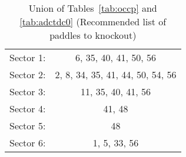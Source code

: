 \begin{table}
\begin{minipage}{\textwidth}
\begin{center}
\begin{singlespacing}

\caption{\label{tab:tofko}Union of Tables~\ref{tab:occp} and \ref{tab:adctdc0} (Recommended list of paddles to knockout)}

\begin{tabular}{lc}

\hline \hline

Sector 1: & 6, 35, 40, 41, 50, 56\\
Sector 2: & 2, 8, 34, 35, 41, 44, 50, 54, 56\\
Sector 3: & 11, 35, 40, 41, 56\\
Sector 4: & 41, 48 \\
Sector 5: & 48\\
Sector 6: & 1, 5, 33, 56 \\

\hline \hline

\end{tabular}

\end{singlespacing}
\end{center}
\end{minipage}
\end{table}

